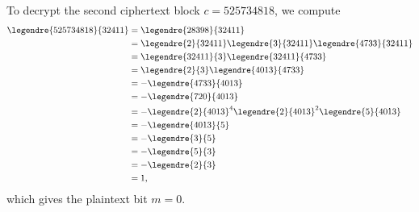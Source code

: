 \documentclass[
  coursecode={MTHE 418},
  assignmentname={Homework \homeworknumber},
  studentnumber=20053722,
  name={Bryan Hoang},
  draft,
]{
  ltxanswer%
}
\begin{document}
\begin{questions}
\begin{parts}
\begin{solution}
        To decrypt the second ciphertext block \(c = 525734818\), we compute
        \begin{align*}
          \legendre{525734818}{32411} &= \legendre{28398}{32411}                                           \\
                                      &= \legendre{2}{32411} \legendre{3}{32411} \legendre{4733}{32411}    \\
                                      &= \legendre{32411}{3} \legendre{32411}{4733}                        \\
                                      &= \legendre{2}{3} \legendre{4013}{4733}                             \\
                                      &= -\legendre{4733}{4013}                                            \\
                                      &= -\legendre{720}{4013}                                             \\
                                      &= -\legendre{2}{4013}^{4} \legendre{2}{4013}^{2} \legendre{5}{4013} \\
                                      &= -\legendre{4013}{5}                                               \\
                                      &= -\legendre{3}{5}                                                  \\
                                      &= -\legendre{5}{3}                                                  \\
                                      &= -\legendre{2}{3}                                                  \\
                                      &= 1,
        \end{align*}
        which gives the plaintext bit \(m = 0\).

        \newpage


\end{solution}
\end{parts}
\end{questions}
\end{document}
